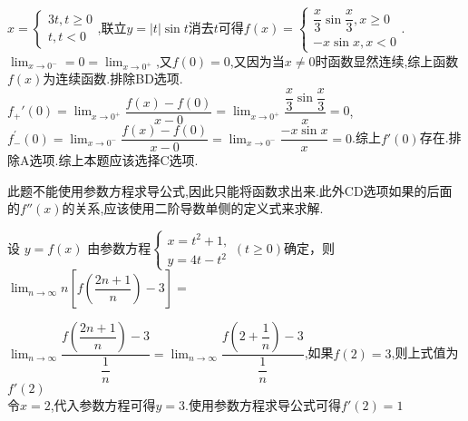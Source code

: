 \documentclass[8pt a4paper, oneside, UTF8]{ctexbook}  %
\begin{document}
\begin{sloppypar}
\begin{problem}
        \end{problem}
        \begin{solution}
            $x=\begin{cases}
               3t,t \geq 0\\
               t,t<0
            \end{cases}$,联立$y=|t|\sin t$消去$t$可得$f(x)=\begin{cases}
                \dfrac{x}{3}\sin \dfrac{x}{3} ,x\geq 0\\
                    -x\sin x, x < 0
            \end{cases}$.
            $\lim_{x\to 0^-}=0=\lim_{x\to 0^+}$,又$f(0)=0$,又因为当$x\neq0$时函数显然连续,综上函数$f(x)$为连续函数.排除BD选项.$ f_+'(0)=\lim_{x\to 0^+} \dfrac{f(x)-f(0)}{x-0}=\lim_{x\to 0^+}\dfrac{\dfrac{x}{3}\sin\dfrac{x}{3}}{x}=0$,$f_{-}^{\prime}(0)=\lim_{x\to0^{-}}\dfrac{f(x)-f(0)}{x-0}=\lim_{x\to0^{-}}\dfrac{-x\sin x}{x}=0$.综上$f'(0)$存在.排除A选项.综上本题应该选择C选项.
        \end{solution}
        \begin{note}
            此题不能使用参数方程求导公式,因此只能将函数求出来.此外CD选项如果的后面的$f''(x)$的关系,应该使用二阶导数单侧的定义式来求解.
        \end{note}
    \begin{problem}
        设 $y=f(x)$ 由参数方程$\begin{cases}x=t^2+1,\\y=4t-t^2\end{cases}(t\geqslant0)$确定，则$\lim_{n\to\infty} n\left[f\left(\dfrac{2n+1}n\right)-3\right]=$   
    \end{problem}
    \begin{solution}
        $\lim_{n \to \infty}\dfrac{f(\dfrac{2n+1}{n})-3}{\dfrac1n}=\lim_{n \to \infty}\dfrac{f(2+\dfrac{1}{n})-3}{\dfrac{1}{n}}$,如果$f(2)=3$,则上式值为$f'(2)$\\
        令$x=2$,代入参数方程可得$y=3$.使用参数方程求导公式可得$f'(2)=1$
    \end{solution}

\end{sloppypar}
\end{document}
